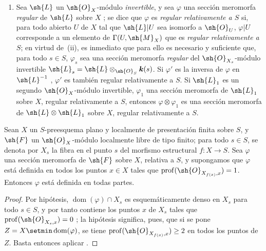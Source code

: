 \begin{remarks}[20.6.5]
\begin{enumerate}[label=(\roman*)]
  \item Sea $\sh{L}$ un $\sh{O}_X$-módulo \emph{invertible}, y sea $\varphi$ una sección meromorfa \emph{regular} de $\sh{L}$ sobre $X$ ; se dice que $\varphi$ es \emph{regular relativamente a $S$} si, para todo abierto $U$ de $X$ tal que $\sh{L}|U$ sea isomorfo a $\sh{O}_U$, $\varphi|U$ corresponde a un elemento de $\Gamma(U,\sh{M}_X)$ que es \emph{regular relativamente a $S$}; en virtud de~(ii), es inmediato que para ello es necesario y suficiente que, para todo $s\in S$, $\varphi_s$ sea una sección meromorfa \emph{regular}  del $\sh{O}_{X_s}$-módulo invertible $\sh{L}_s=\sh{L}\otimes_{\sh{O}_S}\boldsymbol{k}(s)$.
  Si $\varphi'$ es la inversa de $\varphi$ en $\sh{L}^{-1}$ , $\varphi'$ es también regular relativamente a $S$.
  Si $\sh{L}_1$ es un segundo $\sh{O}_X$-módulo invertible, $\varphi_1$ una sección meromorfa de $\sh{L}_1$ sobre $X$, regular relativamente a $S$, entonces $\varphi\otimes\varphi_1$ es una sección meromorfa de $\sh{L}\otimes\sh{L}_1$ sobre $X$, regular relativamente a $S$.
\end{enumerate}
\end{remarks}

\begin{proposition}[20.6.6]
\label{IV.20.6.6}
Sean $X$ un $S$-preesquema plano y localmente de presentación finita sobre $S$, y $\sh{F}$ un $\sh{O}_X$-módulo localmente libre de tipo finito; para todo $s\in S$, se denota por $X_s$ la fibra en el punto $s$ del morfismo estructural $f:X\to S$.
Sea $\varphi$ una sección meromorfa de $\sh{F}$ sobre $X$, relativa a $S$, y supongamos que $\varphi$ está definida en todos los puntos $x\in X$ tales que $\operatorname{prof}(\sh{O}_{X_{f(x)},x})=1$.
Entonces $\varphi$ está definida en todas partes.
\end{proposition}

\begin{proof}
Por hipótesis, $\operatorname{dom}(\varphi)\cap X_s$ es esquemáticamente denso en $X_s$ para todo $s\in S$, y por tanto contiene los puntos $x$ de $X_s$ tales que $\operatorname{prof}(\sh{O}_{X_s,x})=0$ ; la hipótesis significa, pues, que si se pone $Z=X\setmin\operatorname{dom}(\varphi)$, se tiene $\operatorname{prof}(\sh{O}_{X_{f(x)},x})\geq2$ en todos los puntos de $Z$.
Basta entonces aplicar .
\end{proof}


